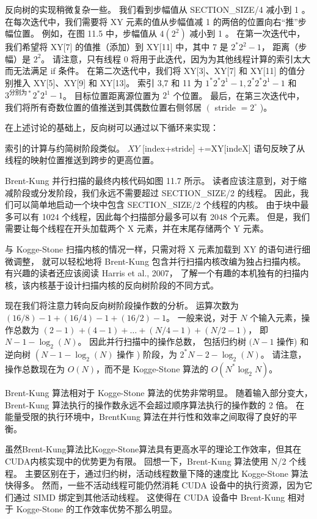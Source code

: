 反向树的实现稍微复杂一些。 我们看到步幅值从 SECTION\_SIZE/4 减小到 1 。 
在每次迭代中，我们需要将 XY 元素的值从步幅值减 1 的两倍的位置向右“推”步幅位置。 
例如，在图 11.5 中，步幅值从 $4\left(2^{2}\right)$ 减小到 1 。 
在第一次迭代中，我们希望将 XY[7] 的值推（添加）到 XY[11] 中，其中 7 是 $2^{*} 2^{2}-1$，
距离（步幅）是 $2^{ 2}$。 请注意，只有线程 0 将用于此迭代，因为为其他线程计算的索引太大而无法满足 if 条件。 
在第二次迭代中，我们将 XY[3]、XY[7] 和 XY[11] 的值分别推入 XY[5]、XY[9] 和 XY[13]。 
索引 3,7 和 11 为 $1^{*} 2^{*} 2^{1}-1,2^{*} 2^{*} 2^{1}-1$ 和 $3^{ 分别为*} 2^{*} 2^{1}-1$。 
目标位置距离源位置为 $2^{1}$ 个位置。 
最后，在第三次迭代中，我们将所有奇数位置的值推送到其偶数位置右侧邻居 $\left(\right.$ stride $=2^{\circ}$ )。

在上述讨论的基础上，反向树可以通过以下循环来实现：

索引的计算与约简树阶段类似。 $X Y$ [index+stride] +=XY[indeX] 语句反映了从线程的映射位置推送到跨步的更高位置。

Brent-Kung 并行扫描的最终内核代码如图 11.7 所示。 
读者应该注意到，对于缩减阶段或分发阶段，我们永远不需要超过 SECTION\_SIZE/2 的线程。 
因此，我们可以简单地启动一个块中包含 SECTION\_SIZE/2 个线程的内核。 
由于块中最多可以有 1024 个线程，因此每个扫描部分最多可以有 2048 个元素。 
但是，我们需要让每个线程在开头加载两个 X 元素，并在末尾存储两个 Y 元素。

与 Kogge-Stone 扫描内核的情况一样，只需对将 X 元素加载到 XY 的语句进行细微调整，
就可以轻松地将 Brent-Kung 包含并行扫描内核改编为独占扫描内核。 有兴趣的读者还应该阅读 Harris et al., 2007，
了解一个有趣的本机独有的扫描内核，该内核基于设计扫描内核的反向树阶段的不同方式。

现在我们将注意力转向反向树阶段操作数的分析。 运算次数为$(16 / 8)-1+(16 / 4)-1+(16 / 2)-1$。 
一般来说，对于 $N$ 个输入元素，操作总数为 $(2-1)$ $+(4-1)+\ldots+(N / 4-1)+(N / 2-1)$， 
即 $N-1-\log _{2}(N)$。 因此并行扫描中的操作总数，
包括归约树 $(N-1$ 操作) 和逆向树 $\left(N-1-\log _{2}(N)\right.$ 操作 ) 阶段，为 $2^{*} N-2-\log _{2}(N)$。 
请注意，操作总数现在为 $O(N)$，而不是 Kogge-Stone 算法的 $O\left(N^{*} \log _{2} N\right)$。

Brent-Kung 算法相对于 Kogge-Stone 算法的优势非常明显。 
随着输入部分变大，Brent-Kung 算法执行的操作数永远不会超过顺序算法执行的操作数的 2 倍。 
在能量受限的执行环境中，BrentKung 算法在并行性和效率之间取得了良好的平衡。

虽然Brent-Kung算法比Kogge-Stone算法具有更高水平的理论工作效率，但其在CUDA内核实现中的优势更为有限。 
回想一下，Brent-Kung 算法使用 N/2 个线程。 主要区别在于，通过归约树，活动线程数量下降的速度比 Kogge-Stone 算法快得多。 
然而，一些不活动线程可能仍然消耗 CUDA 设备中的执行资源，因为它们通过 SIMD 绑定到其他活动线程。 
这使得在 CUDA 设备中 Brent-Kung 相对于 Kogge-Stone 的工作效率优势不那么明显。

